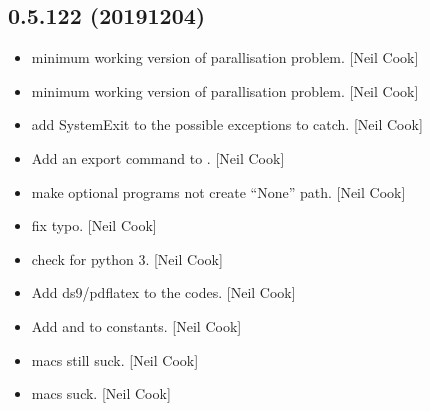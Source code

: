 \documentclass[a4paper,10pt,english]{report}
\begin{document}
\subsection{0.5.122 (2019\sphinxhyphen{}12\sphinxhyphen{}04)}
\label{\detokenize{misc/changelog:id39}}\begin{itemize}
\item {} 
 \sphinxhyphen{} minimum working version of
parallisation problem. {[}Neil Cook{]}

\item {} 
 \sphinxhyphen{} minimum working version of
parallisation problem. {[}Neil Cook{]}

\item {} 
 \sphinxhyphen{} add SystemExit to the possible exceptions
to catch. {[}Neil Cook{]}

\item {} 
Add an export command to . {[}Neil Cook{]}

\item {} 
 \sphinxhyphen{} make optional programs not
create “None” path. {[}Neil Cook{]}

\item {} 
 \sphinxhyphen{} fix typo. {[}Neil Cook{]}

\item {} 
 \sphinxhyphen{} check for python 3. {[}Neil Cook{]}

\item {} 
Add ds9/pdflatex to the codes. {[}Neil Cook{]}

\item {} 
Add  and  to constants. {[}Neil Cook{]}

\item {} 
 \sphinxhyphen{} macs still suck. {[}Neil Cook{]}

\item {} 
 \sphinxhyphen{} macs suck. {[}Neil Cook{]}

\end{itemize}
\end{document}

